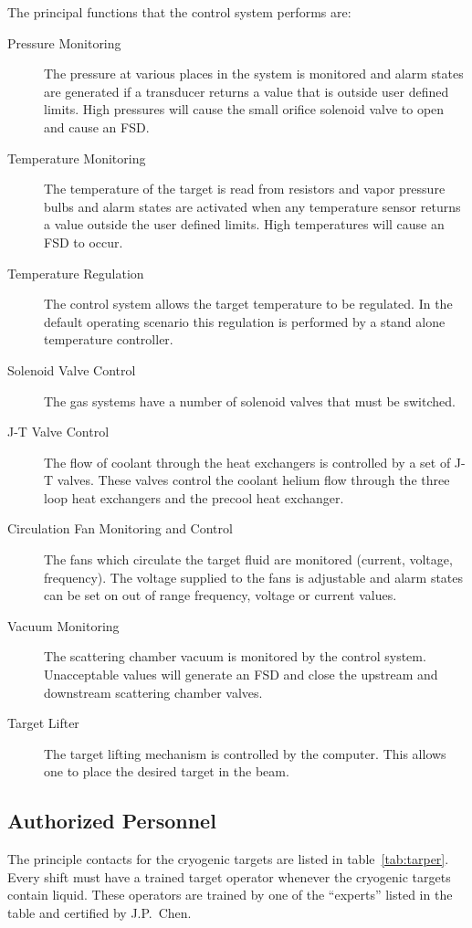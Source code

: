 The principal functions that the control system performs are:
\begin{description}
\item[Pressure Monitoring] The pressure at various places in the system is
monitored and alarm states are generated if a transducer returns a value
that is outside user defined limits. High pressures will cause the
small orifice solenoid valve to open and cause an FSD.
\item[Temperature Monitoring] The temperature of the target
is read from resistors and vapor pressure bulbs and alarm states are
activated when any temperature sensor returns a value outside
the user defined limits. High temperatures will cause an FSD to occur.
\item[Temperature Regulation] The control system allows the target
temperature to be regulated. In the default operating scenario this regulation
is performed by a stand alone temperature controller.
\item[Solenoid Valve Control] The gas systems have a number of solenoid valves
that must be switched.
\item[J-T Valve Control] The flow of coolant through the heat exchangers
is controlled by a set of J-T valves. These valves control the coolant 
helium flow through the three loop heat exchangers and the precool heat
exchanger.
\item[Circulation Fan Monitoring and Control] The fans which circulate
the target fluid are monitored (current, voltage, frequency). The
voltage supplied to the fans is adjustable and alarm states can be set
on out of range frequency, voltage or current values.
\item[Vacuum Monitoring] The scattering chamber vacuum is monitored by
the control system. Unacceptable values will generate an FSD and close
the upstream and downstream  scattering chamber valves.
\item[Target Lifter] The target lifting mechanism is controlled by
the computer. This allows one to place the desired target in the beam.
\end{description}

\subsection{ Authorized Personnel}

The principle contacts for the cryogenic targets are listed in 
table~\ref{tab:tarper}. Every shift must have a trained target
operator whenever the cryogenic targets contain liquid. These
operators are trained by one of the ``experts'' listed in the
table and certified by J.P.~Chen.

